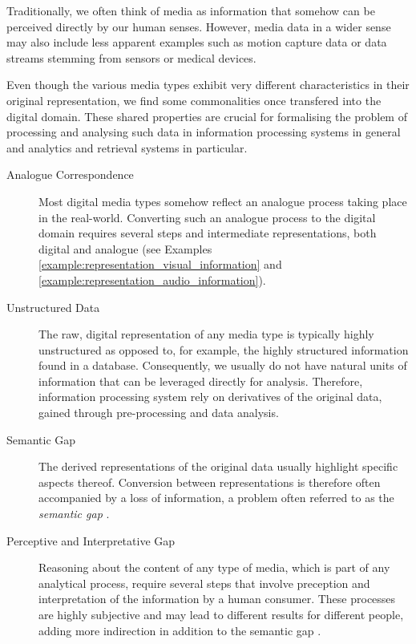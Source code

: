 Traditionally, we often think of media as information that somehow can be perceived directly by our human senses. However, media data in a wider sense may also include less apparent examples such as motion capture data or data streams stemming from sensors or medical devices. 

Even though the various media types exhibit very different characteristics in their original representation, we find some commonalities once transfered into the digital domain. These shared properties are crucial for formalising the problem of processing and analysing such data in information processing systems in general and analytics and retrieval systems in particular.

\begin{description}
    \item[Analogue Correspondence] Most digital media types somehow reflect an analogue process taking place in the real-world. Converting such an analogue process to the digital domain requires several steps and intermediate representations, both digital and analogue (see Examples \ref{example:representation_visual_information} and \ref{example:representation_audio_information}).

    \item[Unstructured Data] The raw, digital representation of any media type is typically highly unstructured as opposed to, for example, the highly structured information found in a database. Consequently, we usually do not have natural units of information that can be leveraged directly for analysis. Therefore, information processing system rely on derivatives of the original data, gained through pre-processing and data analysis.
    
    \item[Semantic Gap] The derived representations of the original data usually highlight specific aspects thereof. Conversion between representations is therefore often accompanied by a loss of information, a problem often referred to as the \emph{semantic gap} \cite{Blanken:2007multimedia, Rossetto:2018thesis}.

    \item[Perceptive and Interpretative Gap] Reasoning about the content of any type of media, which is part of any analytical process, require several steps that involve preception and interpretation of the information by a human consumer. These processes are highly subjective and may lead to different results for different people, adding more indirection in addition to the semantic gap \cite{Rossetto:2018thesis}.
\end{description}

